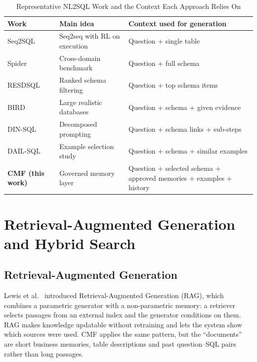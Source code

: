 \begin{table}[H]
    \centering
    \small
    \caption{Representative NL2SQL Work and the Context Each Approach Relies On}
    \begin{tabular}{p{3.2cm} p{4.6cm} p{5.2cm}}
        \toprule
        \textbf{Work} & \textbf{Main idea} & \textbf{Context used for generation} \\
        \midrule
        Seq2SQL \cite{zhong2017seq2sql} & Seq2seq with RL on execution & Question + single table \\[4pt]
        Spider \cite{yu2018spider}      & Cross-domain benchmark & Question + full schema \\[4pt]
        RESDSQL \cite{li2023resdsql}    & Ranked schema filtering & Question + top schema items \\[4pt]
        BIRD \cite{li2023bird}          & Large realistic databases & Question + schema + given evidence \\[4pt]
        DIN-SQL \cite{pourreza2023dinsql} & Decomposed prompting & Question + schema links + sub-steps \\[4pt]
        DAIL-SQL \cite{gao2023dailsql}  & Example selection study & Question + schema + similar examples \\[4pt]
        \textbf{CMF (this work)}        & Governed memory layer & Question + selected schema + approved memories + examples + history \\
        \bottomrule
    \end{tabular}
    \label{tab:nl2sql_survey}
\end{table}

\section{Retrieval-Augmented Generation and Hybrid Search}

\subsection{Retrieval-Augmented Generation}
Lewis et al.\ \cite{lewis2020rag} introduced Retrieval-Augmented Generation (RAG), which
combines a parametric generator with a non-parametric memory: a retriever selects passages
from an external index and the generator conditions on them. RAG makes knowledge updatable
without retraining and lets the system show which sources were used. CMF applies the same
pattern, but the ``documents'' are short business memories, table descriptions and past
question--SQL pairs rather than long passages.

